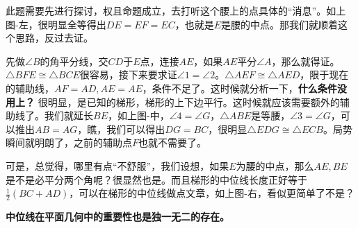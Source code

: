 \documentclass[../main.tex]{subfiles}
\begin{document}
\begin{solution}
\begin{minipage}{0.3\textwidth}
  \end{minipage}

  此题需要先进行探讨，权且命题成立，去打听这个腰上的点具体的“消息”。如上图-左，很明显全等得出$DE=EF=EC$，也就是$E$是腰的中点。那我们就顺着这个思路，反过去证。

  先做$\angle B$的角平分线，交$CD$于$E$点，连接$AE$，如果$AE$平分$\angle A$，那么就得证。$\triangle BFE \cong \triangle BCE$很容易，接下来要求证$\angle 1=\angle 2$。$\triangle AEF \cong \triangle AED$，限于现在的辅助线，$AF=AD, AE=AE$，条件不足了。这时候就分析一下，\textbf{什么条件没用上？} 很明显，是已知的梯形，梯形的上下边平行。这时候就应该需要额外的辅助线了。我们就延长$BE$，如上图-中，$\angle 4 = \angle G$，$\triangle ABE$是等腰，$\angle 3 = \angle G$，可以推出$AB=AG$，瞧，我们可以得出$DG=BC$，很明显$\triangle EDG \cong \triangle ECB$。局势瞬间就明朗了，之前的辅助点$F$也就不需要了。

  可是，总觉得，哪里有点“不舒服”，我们设想，如果$E$为腰的中点，那么$AE,BE$是不是必平分两个角呢？很显然也是。而且梯形的中位线长度正好等于$\frac{1}{2}(BC+AD)$，可以在梯形的中位线做点文章，如上图-右，看似更简单了不是？

  \textbf{中位线在平面几何中的重要性也是独一无二的存在。}

\end{solution}
\end{document}
